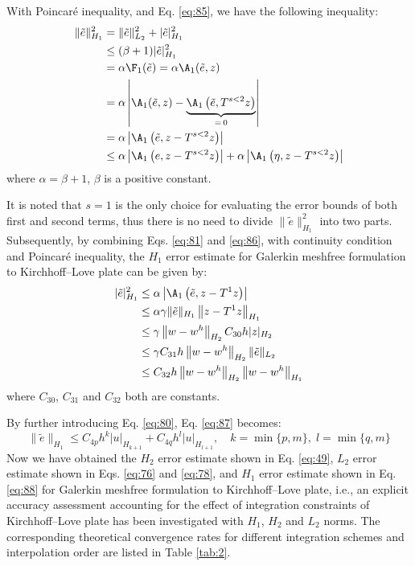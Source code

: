 With Poincar\'e inequality, and Eq. \eqref{eq:85}, we have the following inequality:
\begin{equation}\label{eq:86}
\begin{aligned}
\|\tilde{e}\|^{2}_{H_1}&=\|\tilde{e}\|^{2}_{L_2}+|\tilde{e}|^{2}_{H_1}\\
&\le(\beta+1)|\tilde{e}|^{2}_{H_1}\\
&=\alpha\F_1(\tilde{e})=\alpha\A_1(\tilde{e},z)\\
&=\alpha\left|\A_1(\tilde{e},z)-\underbrace{\A_1\left(\tilde{e},T^{s<2}z\right)}_{=\,0}\right|\\
&=\alpha\left|\A_1\left(\tilde{e},z-T^{s<2}z\right)\right|\\
&\le\alpha\left|\A_1\left(e,z-T^{s<2}z\right)\right|+\alpha\left|\A_1\left(\eta,z-T^{s<2}z\right)\right|
\end{aligned}
\end{equation}
where $\alpha=\beta+1$, $\beta$ is a positive constant.

It is noted that $s=1$ is the only choice for evaluating the error bounds of both first and second terms, thus there is no need to divide $\|\tilde{e}\|^{2}_{H_1}$ into two parts.
Subsequently, by combining Eqs. \eqref{eq:81} and \eqref{eq:86}, with continuity condition and Poincar\'e inequality, the $H_1$ error estimate for Galerkin meshfree formulation to Kirchhoff--Love plate can be given by:
\begin{equation}\label{eq:87}
\begin{aligned}
|\tilde{e}|^{2}_{H_1}&\le\alpha\left|\A_1\left(\tilde{e},z-T^{1}z\right)\right|\\
&\le\alpha\gamma\|\tilde{e}\|_{H_1}\left\|z-T^{1}z\right\|_{H_1}\\
&\le\gamma\left\|w-w^{h}\right\|_{H_2}C_{30}h|z|_{H_2}\\
&\le\gamma C_{31}h\left\|w-w^{h}\right\|_{H_2}\|\tilde{e}\|_{L_2}\\
&\le C_{32}h\left\|w-w^{h}\right\|_{H_2}\left\|w-w^{h}\right\|_{H_1}
\end{aligned}
\end{equation}
where $C_{30}$, $C_{31}$ and $C_{32}$ both are constants.

By further introducing Eq. \eqref{eq:80}, Eq. \eqref{eq:87} becomes:
\begin{equation}\label{eq:88}
\|\tilde{e}\|_{H_1}\le C_{4p}h^{k}|u|_{H_{k+1}}+C_{4q}h^{l}|u|_{H_{l+1}},\quad k=\min\{p,m\},\;l=\min\{q,m\}
\end{equation}
Now we have obtained the $H_2$ error estimate shown in Eq. \eqref{eq:49}, $L_2$ error estimate shown in Eqs. \eqref{eq:76} and \eqref{eq:78}, and $H_1$ error estimate shown in Eq. \eqref{eq:88} for Galerkin meshfree formulation to Kirchhoff--Love plate, i.e., an explicit accuracy assessment accounting for the effect of integration constraints of Kirchhoff--Love plate has been investigated with $H_1$, $H_2$ and $L_2$ norms.
The corresponding theoretical convergence rates for different integration schemes and interpolation order are listed in Table \ref{tab:2}.

